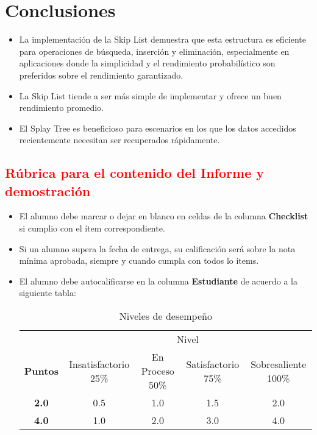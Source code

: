 \documentclass{article}
\begin{document}

  \section{Conclusiones}
  \begin{itemize}
    \item La implementación de la Skip List demuestra que esta estructura es eficiente para operaciones de búsqueda, inserción 
    y eliminación, especialmente en aplicaciones donde la simplicidad y el rendimiento probabilístico son preferidos sobre el rendimiento garantizado.
    \item La Skip List tiende a ser más simple de implementar y ofrece un buen rendimiento promedio.
    \item El Splay Tree es beneficioso para escenarios en los que los datos accedidos recientemente necesitan ser recuperados rápidamente.
  \end{itemize}

	\newpage
	\subsection{\textcolor{red}{Rúbrica para el contenido del Informe y demostración}}
	\begin{itemize}			
		\item El alumno debe marcar o dejar en blanco en celdas de la columna \textbf{Checklist} si cumplio con el ítem correspondiente.
		\item Si un alumno supera la fecha de entrega,  su calificación será sobre la nota mínima aprobada, siempre y cuando cumpla con todos lo items.
		\item El alumno debe autocalificarse en la columna \textbf{Estudiante} de acuerdo a la siguiente tabla:
	
		\begin{table}[ht]
			\caption{Niveles de desempeño}
			\begin{center}
			\begin{tabular}{ccccc}
    			\hline
    			 & \multicolumn{4}{c}{Nivel}\\
    			\cline{1-5}
    			\textbf{Puntos} & Insatisfactorio 25\%& En Proceso 50\% & Satisfactorio 75\% & Sobresaliente 100\%\\
    			\textbf{2.0}&0.5&1.0&1.5&2.0\\
    			\textbf{4.0}&1.0&2.0&3.0&4.0\\
    		\hline
			\end{tabular}
		\end{center}
	\end{table}	
	

	\end{itemize}
\end{document}
